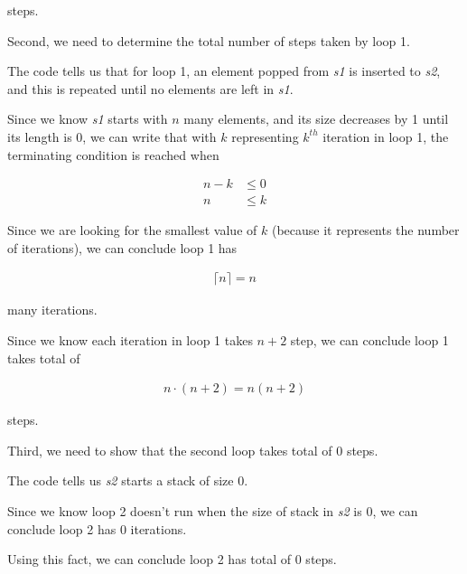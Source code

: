 \documentclass[12pt]{article}
\begin{document}
\begin{enumerate}[a.]
    steps.

    \bigskip

    Second, we need to determine the total number of steps taken by loop 1.

    \bigskip

    The code tells us that for loop 1, an element popped from \textit{s1} is inserted to \textit{s2},
    and this is repeated until no elements are left in \textit{s1}.

    \bigskip

    Since we know \textit{s1} starts with $n$ many elements, and its size decreases
    by 1 until its length is 0, we can write that with $k$ representing
    $k^{th}$ iteration in loop 1, the terminating condition is reached when

    \begin{align}
        n - k &\leq 0\\
        n &\leq k
    \end{align}

    \bigskip

    Since we are looking for the smallest value of $k$ (because it represents
    the number of iterations), we can conclude loop 1 has

    \begin{align}
        \lceil n \rceil = n
    \end{align}

    many iterations.

    \bigskip

    Since we know each iteration in loop 1 takes $n+2$ step, we can conclude
    loop 1 takes total of

    \begin{align}
        n \cdot (n+2) = n(n+2)
    \end{align}

    steps.

    \bigskip

    Third, we need to show that the second loop takes total of 0 steps.

    \bigskip

    The code tells us \textit{s2} starts a stack of size 0.

    \bigskip

    Since we know loop 2 doesn't run when the size of stack in \textit{s2} is 0,
    we can conclude loop 2 has 0 iterations.

    \bigskip

    Using this fact, we can conclude loop 2 has total of 0 steps.


\end{enumerate}
\end{document}
